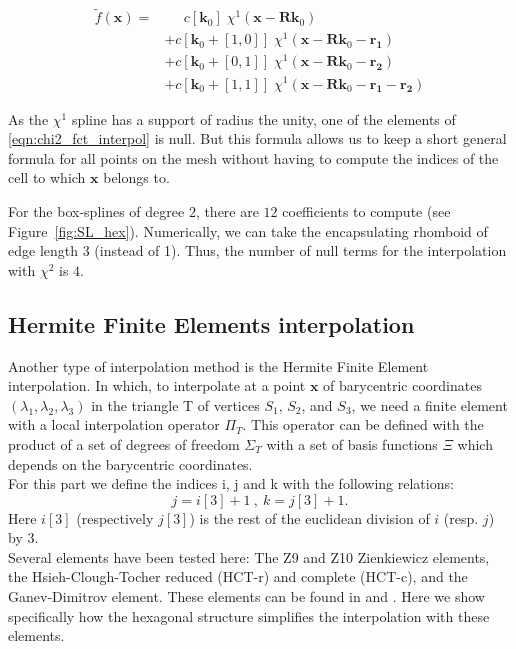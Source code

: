 \documentclass[proc]{edpsmath}
\begin{document}
\begin{align}
\label{eqn:chi2_fct_interpol}
\tilde{f}(\mathbf{x}) =& \;\;\;\;\; c[\mathbf{k}_0] \; \chi^1(\mathbf{x} - \mathbf{R}\mathbf{k}_0) \nonumber\\
	&+ c[\mathbf{k}_0 +[1,0]]\; \chi^1(\mathbf{x} - \mathbf{R}\mathbf{k}_0 - \mathbf{r_1}) \nonumber\\
	&+ c[\mathbf{k}_0 +[0,1]]\; \chi^1(\mathbf{x} - \mathbf{R}\mathbf{k}_0 - \mathbf{r_2}) \nonumber\\
	&+ c[\mathbf{k}_0 +[1,1]]\; \chi^1(\mathbf{x} - \mathbf{R}\mathbf{k}_0 - \mathbf{r_1} - \mathbf{r_2})
\end{align}

\rmrk  As the $\chi^1$ spline has a support of radius the unity, one of the elements of \eqref{eqn:chi2_fct_interpol} is null. But this formula allows us to keep a short general formula for all points on the mesh without having to compute the indices of the cell to which $\mathbf{x}$ belongs to.

\rmrk For the box-splines of degree $2$, there are $12$ coefficients to compute (see Figure~\ref{fig:SL_hex}). Numerically, we can take the encapsulating rhomboid of edge length $3$ (instead of 1). Thus, the number of null terms for the interpolation with $\chi^2$ is $4$.


\subsection{Hermite Finite Elements interpolation}

Another type of interpolation method is the Hermite Finite Element interpolation.
In which, to interpolate at a point $\mathbf{x}$ of barycentric coordinates $(\lambda_1,\lambda_2,\lambda_3)$ in the triangle T of vertices $S_1$, $S_2$, and $S_3$, we need a finite element with a local interpolation operator $\Pi_T $. This operator can be defined with the product of a set of degrees of freedom $\Sigma_T$ with a set of basis functions $\Xi$ which depends on the barycentric coordinates.\\
For this part we define the indices i, j and k with the following relations:
\begin{equation*}
j=i[3]+1 ~,~ k=j[3]+1.
\end{equation*}  
Here $i[3]$ (respectively $j[3]$) is the rest of the euclidean division of $i$ (resp. $j$) by $3$.\\

Several elements have been tested here:
The Z9 and Z10 Zienkiewicz elements, the Hsieh-Clough-Tocher reduced (HCT-r) and complete (HCT-c), and the Ganev-Dimitrov element. These elements can be found in \cite{z} and \cite{b1} . Here we show specifically how the hexagonal structure simplifies the interpolation with these elements.\\
\end{document}

